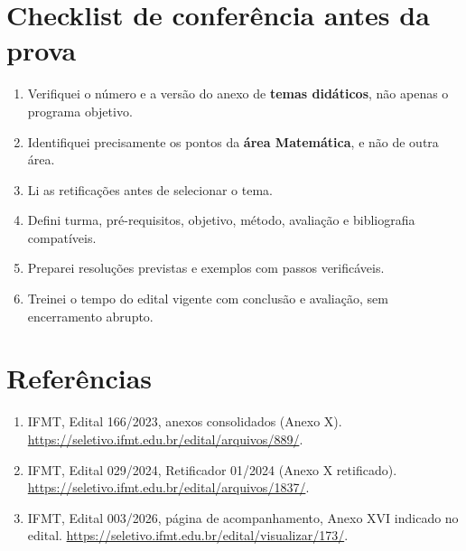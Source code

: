 \documentclass[11pt,a4paper]{article}
\begin{document}
\section{Checklist de conferência antes da prova}
\begin{enumerate}[label={$\square$}]
\item Verifiquei o número e a versão do anexo de \textbf{temas didáticos}, não apenas o programa objetivo.
\item Identifiquei precisamente os pontos da \textbf{área Matemática}, e não de outra área.
\item Li as retificações antes de selecionar o tema.
\item Defini turma, pré-requisitos, objetivo, método, avaliação e bibliografia compatíveis.
\item Preparei resoluções previstas e exemplos com passos verificáveis.
\item Treinei o tempo do edital vigente com conclusão e avaliação, sem encerramento abrupto.
\end{enumerate}
\section*{Referências}
\begin{enumerate}
\item IFMT, Edital 166/2023, anexos consolidados (Anexo X). \url{https://seletivo.ifmt.edu.br/edital/arquivos/889/}.
\item IFMT, Edital 029/2024, Retificador 01/2024 (Anexo X retificado). \url{https://seletivo.ifmt.edu.br/edital/arquivos/1837/}.
\item IFMT, Edital 003/2026, página de acompanhamento, Anexo XVI indicado no edital. \url{https://seletivo.ifmt.edu.br/edital/visualizar/173/}.
\end{enumerate}
\end{document}
